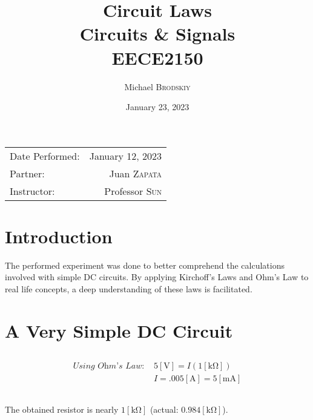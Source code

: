 \documentclass[
	letterpaper, %
	10pt, %
]{CSUniSchoolLabReport}
\title{Circuit Laws \\ Circuits \& Signals \\ EECE2150} %
\author{Michael \textsc{Brodskiy}}
\date{January 23, 2023} %
\begin{document}
\maketitle %

\begin{center}
	\begin{tabular}{l r}
		Date Performed: & January 12, 2023 \\ %
        Partner: & Juan \textsc{Zapata} \\ %
		Instructor: & Professor \textsc{Sun} %
	\end{tabular}
\end{center}

\setcounter{section}{-1}

\section{Introduction}

The performed experiment was done to better comprehend the calculations involved with simple DC circuits. By applying Kirchoff's Laws and Ohm's Law to real life concepts, a deep understanding of these laws is facilitated.

\section{A Very Simple DC Circuit}

\subsection{}

\begin{equation}
  \begin{split}
    \textit{Using Ohm's Law: } & 5[\si{\volt}]=I(1[\si{\kilo\ohm}])\\
    & I=.005[\si{\ampere}]=5[\si{\milli\ampere}]
  \end{split}
  \label{eq:1}
\end{equation}

\subsection{}

The obtained resistor is nearly $1[\si{\kilo\ohm}]$ (actual: $0.984[\si{\kilo\ohm}]$).
\end{document}
